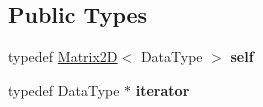 \subsection*{Public Types}
\begin{DoxyCompactItemize}
\item 
\mbox{\label{classez_1_1objects_1_1Matrix3D_a5a17da6e4dc5af4923219ce71c8790c8}} 
typedef \hyperlink{classez_1_1objects_1_1Matrix2D}{Matrix2D}$<$ Data\+Type $>$ {\bfseries self}
\item 
\mbox{\label{classez_1_1objects_1_1Matrix3D_abcdbe37fb87dbfb21149eb2105cd94df}} 
typedef Data\+Type $\ast$ {\bfseries iterator}
\end{DoxyCompactItemize}
